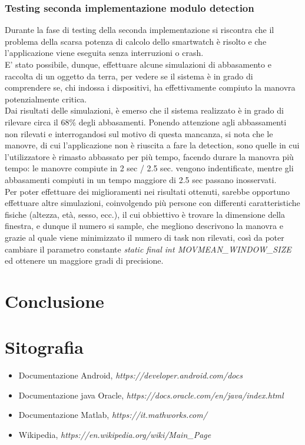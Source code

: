 \documentclass[a4paper]{article}
\begin{document}
\subsubsection{Testing seconda implementazione modulo detection}
Durante la fase di testing della seconda implementazione si riscontra che il problema della scarsa potenza di calcolo dello smartwatch è risolto e che l'applicazione viene eseguita senza interruzioni o crash. \\
E' stato possibile, dunque, effettuare alcune simulazioni di abbasamento e raccolta di un oggetto da terra, per vedere se il sistema è in grado di comprendere se, chi indossa i dispositivi, ha effettivamente compiuto la manovra potenzialmente critica.\\
Dai risultati delle simulazioni, è emerso che il sistema realizzato è in grado di rilevare circa il 68\% degli abbasamenti. Ponendo attenzione agli abbassamenti non rilevati e interrogandosi sul motivo di questa mancanza, si nota che le manovre, di cui l'applicazione non è riuscita a fare la detection, sono quelle in cui l'utilizzatore è rimasto abbassato per più tempo, facendo durare la manovra più tempo: le manovre compiute in 2 sec / 2.5 sec. vengono indentificate, mentre gli abbasamenti compiuti in un tempo maggiore di 2.5 sec passano inosservati. \\
Per poter effettuare dei miglioramenti nei risultati ottenuti, sarebbe opportuno effettuare altre simulazioni, coinvolgendo più persone con differenti caratteristiche fisiche (altezza, età, sesso, ecc.), il cui obbiettivo è trovare la dimensione della finestra, e dunque il numero si sample, che megliono descrivono la manovra e grazie al quale viene minimizzato il numero di task non rilevati, così da poter cambiare il parametro constante \textit{static final int MOVMEAN\_WINDOW\_SIZE} ed ottenere un maggiore gradi di precisione.
\clearpage
	\section{Conclusione}


\clearpage
	\section{Sitografia}

\begin{itemize}
\item Documentazione Android, \textit{https://developer.android.com/docs}
\item Documentazione java Oracle, \textit{https://docs.oracle.com/en/java/index.html}
\item Documentazione Matlab, \textit{https://it.mathworks.com/}
\item Wikipedia, \textit{https://en.wikipedia.org/wiki/Main\_Page}
\end{itemize}
\end{document}

